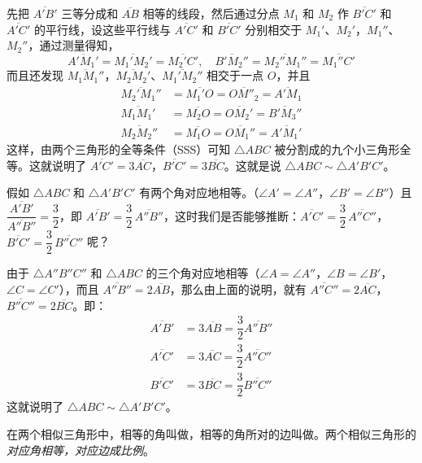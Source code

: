 先把 $\overline{A'B'}$ 三等分成和 $\overline{AB}$ 相等的线段，然后通过分点 ${M_1}$ 和 $M_2$ 作 $\overline{B'C'}$ 和 $\overline{A'C'}$ 的平行线，设这些平行线与 $\overline{A'C'}$ 和 $\overline{B'C'}$ 分别相交于 $M_1'$、$M_2'$，$M_1''$、$M_2''$，通过测量得知，
\[\overline{A'M_1'}=\overline{M_1'M_2'}=\overline{M_2'C'},\quad \overline{B'M_2''}=\overline{M_2''M_1''}
=\overline{M_1''C'}\]
而且还发现 $\overline{M_1M_1''}$，$\overline{M_2M_2'}$、$\overline{M_1'M_2''}$ 相交于一点 $O$，并且
\[\begin{split}
	\overline{M_2'M_1''}&=\overline{M_1'O}=\overline{OM''_2}=\overline{A'M_1}\\
	\overline{M_1M_1'}&=\overline{M_2O}=\overline{OM_2'}=\overline{B'M_3''}\\
	\overline{M_2M_2''}&=\overline{M_1O}=\overline{OM_1''}=\overline{A'M_1'}
\end{split}\]
这样，由两个三角形的全等条件（SSS）可知 $\triangle ABC$ 被分割成的九个小三角形全等。这就说明了 $\overline{A'C'}=3\overline{AC}$，$\overline{B'C'}=3\overline{BC}$。这就是说 $\triangle ABC\sim \triangle A'B'C'$。

{\linespread{2.0}\selectfont
假如 $\triangle ABC$ 和 $\triangle A'B'C'$ 有两个角对应地相等。（$\angle A'=\angle A''$，$\angle B'=\angle B''$）且 $\dfrac{\overline{A'B'}}{\overline{A''B''}}=\dfrac{3}{2}$，即 $\overline{A'B'}=\dfrac{3}{2}\,\overline{A''B''}$，这时我们是否能够推断：$\overline{A'C'}=\dfrac{3}{2}\,\overline{A''C''}$，$\overline{B'C'}=\dfrac{3}{2}\,\overline{B''C''}$ 呢？\par}

\bigskip
由于 $\triangle A''B''C''$ 和 $\triangle ABC$ 的三个角对应地相等（$\angle A=\angle A''$，$\angle B=\angle B'$，$\angle C=\angle C'$），而且 $\overline{A''B''}=2\overline{AB}$，那么由上面的说明，就有 $\overline{A''C''}=2\overline{AC}$，$\overline{B''C''}=2\overline{BC}$。即：
\[\begin{split}
	\overline{A'B'}&=3\overline{AB}=\dfrac{3}{2}\overline{A''B''}\\
	\overline{A'C'}&=3\overline{AC}=\dfrac{3}{2}\overline{A''C''}\\
 \overline{B'C'}&=3\overline{BC}=\dfrac{3}{2}\overline{B''C''}
\end{split}
	\]
这就说明了 $\triangle ABC\sim \triangle A'B'C'$。

在两个相似三角形中，相等的角叫做，相等的角所对的边叫做。两个相似三角形的\emph{对应角相等，对应边成比例}。


